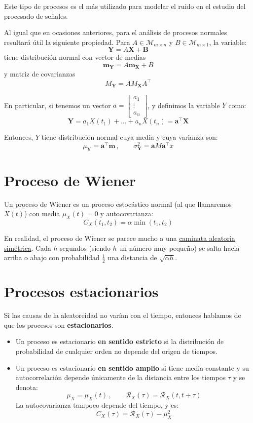 \documentclass[a4paper]{book}
\renewcommand{\vec}[1]{\mathbf{#1}} %
\begin{document}
Este tipo de procesos es el más utilizado para modelar el ruido en el estudio del procesado de señales.

Al igual que en ocasiones anteriores, para el análisis de procesos normales resultará útil la siguiente propiedad. Para $A\in \mathcal{M}_{m\times n}$ y $B\in \mathcal{M}_{m\times 1}$, la variable:
\[ \vec{Y} = A \vec{X} + \vec{B} \]
tiene distribución normal con vector de medias
\[ \vec{m}_{\vec{Y}}= A \vec{m}_{\vec{X}} + B\]
y matriz de covarianzas
\[ M_{\vec{Y}} = A M_{\vec{X}} A ^{\top} \]

En particular, si tenemos un vector $a=\left[ 
\begin{matrix}
	a_1\\
	\vdots \\
	a_n
\end{matrix} \right]$, y definimos la variable $Y$ como:
\[ \vec{Y}= a_1X(t_1) + \dots + a_nX(t_n) = \vec{a}^{\top}  \vec{X}\]

Entonces, $Y$ tiene distribución normal cuya media y cuya varianza son:
\[ \mu _{\vec{Y}} = \vec{a} ^{\top} \vec{m} \, , \qquad \sigma ^2 _{\vec{Y}} = \vec{a} M \vec{a}^{\top} x\]

\section{Proceso de Wiener}

Un proceso de Wiener es un proceso estocástico normal (al que llamaremos $X(t)$) con media $\mu _X (t) = 0$ y autocovarianza:
\[ C_X \left( t_1, t_2 \right) = \alpha \min\left( t_1, t_2 \right)\]

En realidad, el proceso de Wiener se parece mucho a una \hyperref[sec:caminata_aleatoria_simetrica]{caminata aleatoria simétrica}. Cada $h$ segundos (siendo $h$ un número muy pequeño) se salta hacia arriba o abajo con probabilidad $\frac{1}{2}$ una distancia de $\sqrt{\alpha h}$. 

\section{Procesos estacionarios}

Si las causas de la aleatoreidad no varían con el tiempo, entonces hablamos de que los procesos son \textbf{estacionarios}.

\begin{itemize}
	 \item Un proceso es estacionario \textbf{en sentido estricto} si la distribución de probabilidad de cualquier orden no depende del origen de tiempos.
	 \item Un proceso es estacionario \textbf{en sentido amplio} si tiene media constante y su autocorrelación depende únicamente de la distancia entre los tiempos $\tau$ y se denota:
	 \[ \mu _X = \mu _X(t) \, , \qquad \mathcal{R}_X \left( \tau \right) = \mathcal{R}_X \left( t, t+ \tau \right) \]
	 La autocovarianza tampoco depende del tiempo, y es:
	 \[ C_X(\tau ) = \mathcal{R}_X(\tau )-\mu_X^2 \]
\end{itemize}
\end{document}
